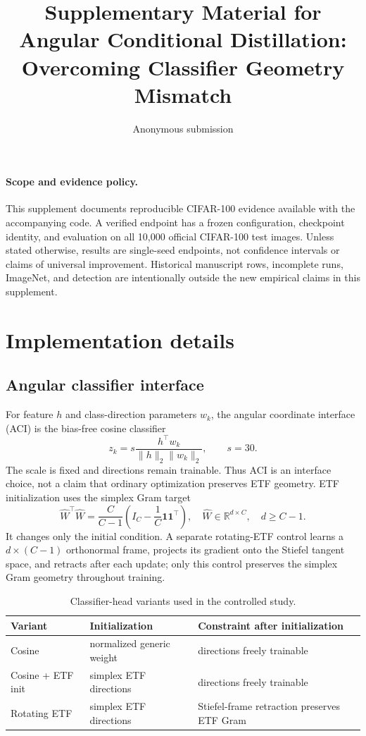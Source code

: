 \documentclass[10pt]{article}
\title{Supplementary Material for\\Angular Conditional Distillation: Overcoming Classifier Geometry Mismatch}
\author{Anonymous submission}
\date{}
\begin{document}
\maketitle

\paragraph{Scope and evidence policy.}
This supplement documents reproducible CIFAR-100 evidence available with the accompanying code. A verified endpoint has a frozen configuration, checkpoint identity, and evaluation on all 10,000 official CIFAR-100 test images. Unless stated otherwise, results are single-seed endpoints, not confidence intervals or claims of universal improvement. Historical manuscript rows, incomplete runs, ImageNet, and detection are intentionally outside the new empirical claims in this supplement.

\section{Implementation details}
\subsection{Angular classifier interface}
For feature $h$ and class-direction parameters $w_k$, the angular coordinate interface (ACI) is the bias-free cosine classifier
\begin{equation}
z_k=s\frac{h^\top w_k}{\lVert h\rVert_2\lVert w_k\rVert_2},\qquad s=30.
\end{equation}
The scale is fixed and directions remain trainable. Thus ACI is an interface choice, not a claim that ordinary optimization preserves ETF geometry. ETF initialization uses the simplex Gram target
\begin{equation}
\widehat W^\top\widehat W=\frac{C}{C-1}\left(I_C-\frac1C\mathbf1\mathbf1^\top\right),\quad \widehat W\in\mathbb R^{d\times C},\quad d\ge C-1.
\end{equation}
It changes only the initial condition. A separate rotating-ETF control learns a $d\times(C-1)$ orthonormal frame, projects its gradient onto the Stiefel tangent space, and retracts after each update; only this control preserves the simplex Gram geometry throughout training.

\begin{table}[h]
\centering
\caption{Classifier-head variants used in the controlled study.}
\label{tab:heads}
\begin{tabular}{lll}
\toprule
Variant & Initialization & Constraint after initialization \\
\midrule
Cosine & normalized generic weight & directions freely trainable \\
Cosine + ETF init & simplex ETF directions & directions freely trainable \\
Rotating ETF & simplex ETF directions & Stiefel-frame retraction preserves ETF Gram \\
\bottomrule
\end{tabular}
\end{table}
\end{document}
